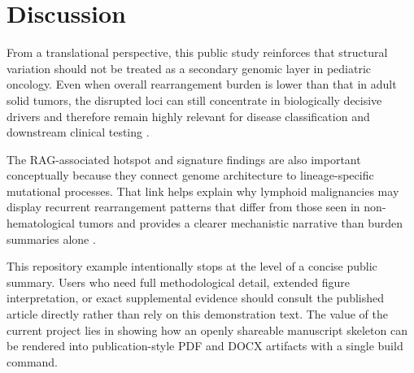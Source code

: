 \section{Discussion}
From a translational perspective, this public study reinforces that
structural variation should not be treated as a secondary genomic layer
in pediatric oncology. Even when overall rearrangement burden is lower
than that in adult solid tumors, the disrupted loci can still
concentrate in biologically decisive drivers and therefore remain highly
relevant for disease classification and downstream clinical testing
\supercite{Greenhalgh_2026}.

The RAG-associated hotspot and signature findings are also important
conceptually because they connect genome architecture to
lineage-specific mutational processes. That link helps explain why
lymphoid malignancies may display recurrent rearrangement patterns that
differ from those seen in non-hematological tumors and provides a
clearer mechanistic narrative than burden summaries alone \supercite{Greenhalgh_2026}.

This repository example intentionally stops at the level of a concise
public summary. Users who need full methodological detail, extended
figure interpretation, or exact supplemental evidence should consult the
published article directly rather than rely on this demonstration text.
The value of the current project lies in showing how an openly shareable
manuscript skeleton can be rendered into publication-style PDF and DOCX
artifacts with a single build command.
